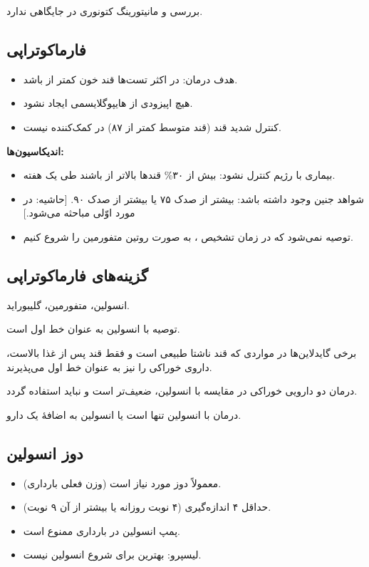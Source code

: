 \documentclass[12pt,a4paper]{article}
\begin{document}
بررسی و مانیتورینگ کتونوری در  جایگاهی ندارد.
\subsection*{فارماکوتراپی }
\begin{itemize}
\item هدف درمان: در اکثر تست‌ها قند خون کمتر از  باشد.
\item هیچ اپیزودی از هایپوگلایسمی ایجاد نشود.
\item کنترل شدید قند (قند متوسط کمتر از ۸۷) در  کمک‌کننده نیست.
\end{itemize}
\textbf{اندیکاسیون‌ها:}
\begin{itemize}
\item بیماری با رژیم کنترل نشود: بیش از ۳۰\% قندها بالاتر از  باشند طی یک هفته.
\item شواهد  جنین وجود داشته باشد:  بیشتر از صدک ۷۵ یا  بیشتر از صدک ۹۰. [حاشیه: در مورد اوّلی مباحثه می‌شود.]
\item توصیه نمی‌شود که در زمان تشخیص ، به صورت روتین متفورمین را شروع کنیم.
\end{itemize}
\subsection*{گزینه‌های فارماکوتراپی}
انسولین، متفورمین، گلیبوراید.

توصیه با انسولین به عنوان خط اول است.

برخی گایدلاین‌ها در مواردی که قند ناشتا طبیعی است و فقط قند پس از غذا بالاست، داروی خوراکی را نیز به عنوان خط اول می‌پذیرند.

درمان دو دارویی خوراکی در مقایسه با انسولین، ضعیف‌تر است و نباید استفاده گردد.

درمان با انسولین تنها است یا انسولین به اضافهٔ یک دارو.
\subsection*{دوز انسولین}
\begin{itemize}
\item معمولاً دوز مورد نیاز  است (وزن فعلی بارداری).
\item حداقل ۴  اندازه‌گیری (۴ نوبت روزانه یا بیشتر از آن ۹ نوبت).
\item پمپ انسولین در بارداری ممنوع است.
\item لیسپرو: بهترین  برای شروع انسولین نیست.
\end{itemize}
\end{document}
